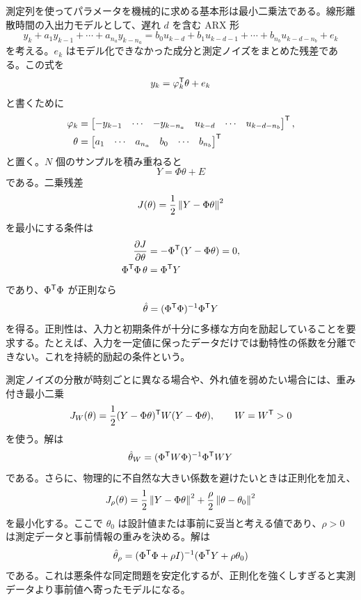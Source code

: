 測定列を使ってパラメータを機械的に求める基本形は最小二乗法である。線形離散時間の入出力モデルとして、遅れ $d$ を含む ARX 形
\begin{equation}
  y_k+a_1y_{k-1}+\cdots+a_{n_a}y_{k-n_a}
  =
  b_0u_{k-d}+b_1u_{k-d-1}+\cdots+b_{n_b}u_{k-d-n_b}+e_k
\end{equation}
を考える。$e_k$ はモデル化できなかった成分と測定ノイズをまとめた残差である。この式を
\begin{equation}
  y_k=\varphi_k^{\mathsf{T}} \theta+e_k
\end{equation}
と書くために
\begin{align}
  \varphi_k&=
  \begin{bmatrix}
    -y_{k-1}&\cdots&-y_{k-n_a}&u_{k-d}&\cdots&u_{k-d-n_b}
  \end{bmatrix}^{\mathsf{T}},\\
  \theta&=
  \begin{bmatrix}
    a_1&\cdots&a_{n_a}&b_0&\cdots&b_{n_b}
  \end{bmatrix}^{\mathsf{T}}
\end{align}
と置く。$N$ 個のサンプルを積み重ねると
\begin{equation}
  Y=\Phi\theta+E
\end{equation}
である。二乗残差
\begin{equation}
  J(\theta)=\frac{1}{2}\left\|Y-\Phi\theta\right\|^{2}
\end{equation}
を最小にする条件は
\begin{align}
  \frac{\partial J}{\partial\theta}
  &=-\Phi^{\mathsf{T}} (Y-\Phi\theta)=0,\\
  \Phi^{\mathsf{T}} \Phi\,\theta&=\Phi^{\mathsf{T}} Y
\end{align}
であり、$\Phi^{\mathsf{T}} \Phi$ が正則なら
\begin{equation}
  \hat{\theta}=(\Phi^{\mathsf{T}} \Phi)^{-1}\Phi^{\mathsf{T}} Y
\end{equation}
を得る。正則性は、入力と初期条件が十分に多様な方向を励起していることを要求する。たとえば、入力を一定値に保ったデータだけでは動特性の係数を分離できない。これを持続的励起の条件という。

測定ノイズの分散が時刻ごとに異なる場合や、外れ値を弱めたい場合には、重み付き最小二乗
\begin{equation}
  J_W(\theta)
  =\frac{1}{2}(Y-\Phi\theta)^{\mathsf{T}} W(Y-\Phi\theta),
  \qquad W=W^{\mathsf{T}}>0
\end{equation}
を使う。解は
\begin{equation}
  \hat{\theta}_W=(\Phi^{\mathsf{T}} W\Phi)^{-1}\Phi^{\mathsf{T}} WY
\end{equation}
である。さらに、物理的に不自然な大きい係数を避けたいときは正則化を加え、
\begin{equation}
  J_\rho(\theta)
  =\frac{1}{2}\left\|Y-\Phi\theta\right\|^{2}
  +\frac{\rho}{2}\left\|\theta-\theta_0\right\|^{2}
\end{equation}
を最小化する。ここで $\theta_0$ は設計値または事前に妥当と考える値であり、$\rho>0$ は測定データと事前情報の重みを決める。解は
\begin{equation}
  \hat{\theta}_\rho
  =(\Phi^{\mathsf{T}} \Phi+\rho I)^{-1}(\Phi^{\mathsf{T}} Y+\rho\theta_0)
\end{equation}
である。これは悪条件な同定問題を安定化するが、正則化を強くしすぎると実測データより事前値へ寄ったモデルになる。

